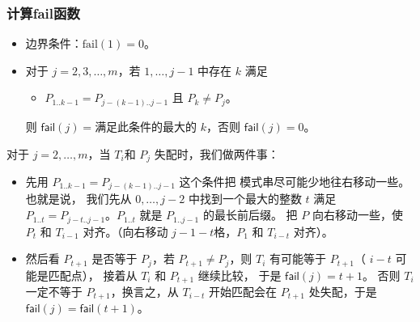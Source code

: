 \documentclass{ctexbeamer}
\newcommand{\fail}{\mathsf{fail}}
\begin{document}
\begin{frame}
\frametitle{计算fail函数}

\begin{block}{}
\begin{itemize}
  \item 边界条件：$\text{fail}(1) = 0$。
  \item 对于 $j = 2, 3, \dots, m$，若 $1, \dots, j - 1$ 中存在 $k$ 满足
  {
  \begin{itemize}
  \item $P_{1..k - 1} = P_{j - (k - 1) .. j - 1}$ 且 $P_{k} \ne P_j$。
  \end{itemize}
  则 $\fail(j) = $满足此条件的最大的 $k$，否则 $\fail(j) = 0$。
  }
  \end{itemize}
\end{block}





对于 $j = 2, \dots, m$，当 $T_i$和 $P_j$ 失配时，我们做两件事：

\begin{itemize}
    \item 先用 $P_{1..k - 1} = P_{j - (k - 1) .. j - 1}$ 这个条件把
          模式串尽可能少地往右移动一些。也就是说，
          我们先从 $0, \dots, j - 2$ 中找到一个最大的整数 $t$ 满足 $P_{1..t} = P_{j-t .. j-1}$。$P_{1..t}$ 就是 $P_{1..j-1}$ 的最长前后缀。
          把 $P$ 向右移动一些，使 $P_{t}$ 和 $T_{i - 1}$ 对齐。（向右移动 $j - 1 - t$格，$P_1$ 和 $T_{i - t}$ 对齐）。 %
    \item 然后看 $P_{t +1}$ 是否等于 $P_j$，若 $P_{t + 1} \ne P_{j}$，则 $T_{i}$ 有可能等于 $P_{t + 1}$（ $i - t$ 可能是匹配点），
    接着从 $T_i$ 和 $P_{t +1}$ 继续比较，
    于是 $\fail(j) = t + 1$。
    否则 $T_{i}$ 一定不等于 $P_{t + 1}$，换言之，从 $T_{i-t}$ 开始匹配会在 $P_{t + 1}$ 处失配，于是 $\fail(j) = \fail(t + 1)$。
\end{itemize}

\end{frame}
\end{document}
